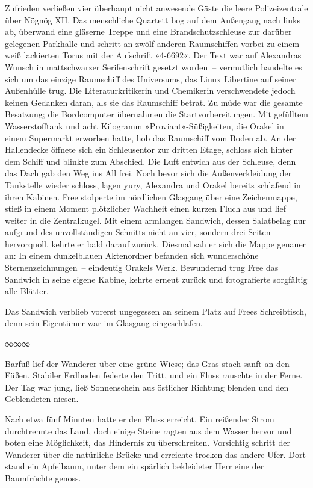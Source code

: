 Zufrieden verließen vier überhaupt nicht anwesende Gäste die leere Polizeizentrale über Nögnög XII. Das menschliche Quartett bog auf dem Außengang nach links ab, überwand eine gläserne Treppe und eine Brandschutzschleuse zur darüber gelegenen Parkhalle und schritt an zwölf anderen Raumschiffen vorbei zu einem weiß lackierten Torus mit der Aufschrift »4-6692«. Der Text war auf Alexandras Wunsch in mattschwarzer Serifenschrift gesetzt worden~– vermutlich handelte es sich um das einzige Raumschiff des Universums, das Linux Libertine auf seiner Außenhülle trug. Die Literaturkritikerin und Chemikerin verschwendete jedoch keinen Gedanken daran, als sie das Raumschiff betrat. Zu müde war die gesamte Besatzung; die Bordcomputer übernahmen die Startvorbereitungen. Mit gefülltem Wasserstofftank und acht Kilogramm »Proviant«-Süßigkeiten, die Orakel in einem Supermarkt erworben hatte, hob das Raumschiff vom Boden ab. An der Hallendecke öffnete sich ein Schleusentor zur dritten Etage, schloss sich hinter dem Schiff und blinkte zum Abschied. Die Luft entwich aus der Schleuse, denn das Dach gab den Weg ins All frei. Noch bevor sich die Außenverkleidung der Tankstelle wieder schloss, lagen yury, Alexandra und Orakel bereits schlafend in ihren Kabinen. Free stolperte im nördlichen Glasgang über eine Zeichenmappe, stieß in einem Moment plötzlicher Wachheit einen kurzen Fluch aus und lief weiter in die Zentralkugel. Mit einem armlangen Sandwich, dessen Salatbelag nur aufgrund des unvollständigen Schnitts nicht an vier, sondern drei Seiten hervorquoll, kehrte er bald darauf zurück. Diesmal sah er sich die Mappe genauer an: In einem dunkelblauen Aktenordner befanden sich wunderschöne Sternenzeichnungen~– eindeutig Orakels Werk. Bewundernd trug Free das Sandwich in seine eigene Kabine, kehrte erneut zurück und fotografierte sorgfältig alle Blätter.

Das Sandwich verblieb vorerst ungegessen an seinem Platz auf Frees Schreibtisch, denn sein Eigentümer war im Glasgang eingeschlafen.

\begin{center}
∞∞∞
\end{center}

Barfuß lief der Wanderer über eine grüne Wiese; das Gras stach sanft an den Füßen. Stabiler Erdboden federte den Tritt, und ein Fluss rauschte in der Ferne. Der Tag war jung, ließ Sonnenschein aus östlicher Richtung blenden und den Geblendeten niesen.

Nach etwa fünf Minuten hatte er den Fluss erreicht. Ein reißender Strom durchtrennte das Land, doch einige Steine ragten aus dem Wasser hervor und boten eine Möglichkeit, das Hindernis zu überschreiten. Vorsichtig schritt der Wanderer über die natürliche Brücke und erreichte trocken das andere Ufer. Dort stand ein Apfelbaum, unter dem ein spärlich bekleideter Herr eine der Baumfrüchte genoss.


